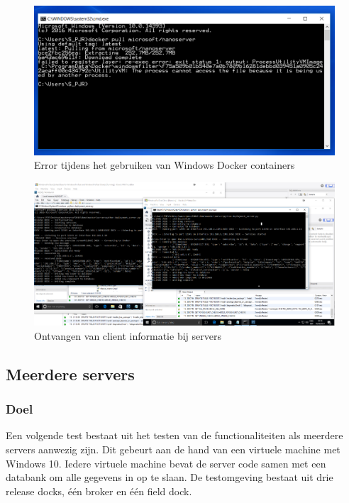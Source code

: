 \begin{figure}
\centering
\includegraphics[width=\textwidth,height=\textheight,keepaspectratio]{afbeelding/testCrossContainer/bad_cut.png}
\caption{Error tijdens het gebruiken van Windows Docker containers}
\label{fig:testContainer:crosscontainer}
\end{figure}

\begin{figure}
\centering
\includegraphics[width=\textwidth,height=\textheight,keepaspectratio]{afbeelding/testMultiServer/receivedSetup.png}
\caption{Ontvangen van client informatie bij servers}
\label{fig:testServer:receiveSetup}
\end{figure}

\subsection{Meerdere servers}
\subsubsection{Doel}
Een volgende test bestaat uit het testen van de functionaliteiten als meerdere servers aanwezig zijn.
Dit gebeurt aan de hand van een virtuele machine met Windows 10.
Iedere virtuele machine bevat de server code samen met een databank om alle gegevens in op te slaan.
De testomgeving bestaat uit drie release docks, één broker en één field dock.


